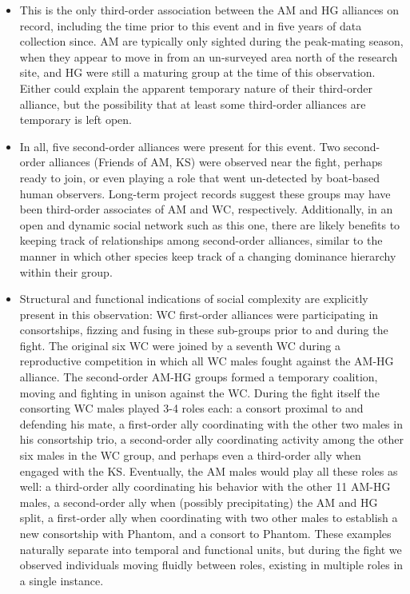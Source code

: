 \documentclass[11pt]{amsart}
\begin{document}
\begin{itemize}
\item{This is the only third-order association between the AM and HG alliances on record, including the time prior to this event and in five years of data collection since. AM are typically only sighted during the peak-mating season, when they appear to move in from an un-surveyed area north of the research site, and HG were still a maturing group at the time of this observation. Either could explain the apparent temporary nature of their third-order alliance, but the possibility that at least some third-order alliances are temporary is left open.} %
\item{In all, five second-order alliances were present for this event. Two second-order alliances (Friends of AM, KS) were observed near the fight, perhaps ready to join, or even playing a role that went un-detected by boat-based human observers. Long-term project records suggest these groups may have been third-order associates of AM and WC, respectively. Additionally, in an open and dynamic social network such as this one, there are likely benefits to keeping track of relationships among second-order alliances, similar to the manner in which other species keep track of a changing dominance hierarchy within their group.} %
\item{Structural and functional indications of social complexity are explicitly present in this observation: WC first-order alliances were participating in consortships, fizzing and fusing in these sub-groups prior to and during the fight. The original six WC were joined by a seventh WC during a reproductive competition in which all WC males fought against the AM-HG alliance. The second-order AM-HG groups formed a temporary coalition, moving and fighting in unison against the WC. During the fight itself the consorting WC males played 3-4 roles each: a consort proximal to and defending his mate, a first-order ally coordinating with the other two males in his consortship trio, a second-order ally coordinating activity among the other six males in the WC group, and perhaps even a third-order ally when engaged with the KS. Eventually, the AM males would play all these roles as well: a third-order ally coordinating his behavior with the other 11 AM-HG males, a second-order ally when (possibly precipitating) the AM and HG split, a first-order ally when coordinating with two other males to establish a new consortship with Phantom, and a consort to Phantom. These examples naturally separate into temporal and functional units, but during the fight we observed individuals moving fluidly between roles, existing in multiple roles in a single instance.} %
\end{itemize}
\end{document}
